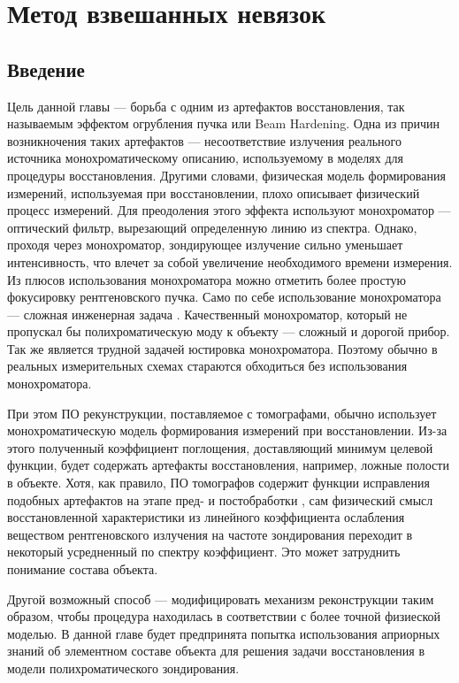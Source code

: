 \chapter{Метод взвешанных невязок} \label{chapt3}
\section{Введение}
Цель данной главы --- борьба с одним из артефактов восстановления, так называемым эффектом огрубления пучка или Beam Hardening. 
Одна из причин возникночения таких артефактов --- несоответствие излучения реального источника монохроматическому описанию, используемому в моделях для процедуры восстановления.
Другими словами, физическая модель формирования измерений, используемая при восстановлении, плохо описывает физический процесс измерений.
Для преодоления этого эффекта используют монохроматор --- оптический фильтр, вырезающий определенную линию из спектра.
Однако, проходя через монохроматор, зондирующее излучение сильно уменьшает интенсивность, что влечет за собой увеличение необходимого времени измерения.
Из плюсов использования монохроматора можно отметить более простую фокусировку рентгеновского пучка.
Само по себе использование монохроматора --- сложная инженерная задача \cite{chukalina2014xray}. 
Качественный монохроматор, который не пропускал бы полихроматическую моду к объекту --- сложный и дорогой прибор. 
Так же является трудной задачей юстировка монохроматора.
Поэтому обычно в реальных измерительных схемах стараются обходиться без использования монохроматора.

При этом ПО рекунструкции, поставляемое с томографами, обычно использует монохроматическую модель формирования измерений при восстановлении.
Из-за этого полученный коэффициент поглощения, доставляющий минимум целевой функции, будет содержать артефакты восстановления, например, ложные полости в объекте.
Хотя, как правило, ПО томографов содержит функции исправления подобных артефактов на этапе пред- и постобработки \cite{van2011iterative}, сам физический смысл восстановленной характеристики из линейного коэффициента ослабления веществом рентгеновского излучения на частоте зондирования переходит в некоторый усредненный по спектру коэффициент.
Это может затруднить понимание состава объекта.

Другой возможный способ --- модифицировать механизм реконструкции таким образом, чтобы процедура находилась в соответствии с более точной физиеской моделью.
В данной главе будет предпринята попытка использования априорных знаний об элементном составе объекта для решения задачи восстановления в модели полихроматического зондирования.


